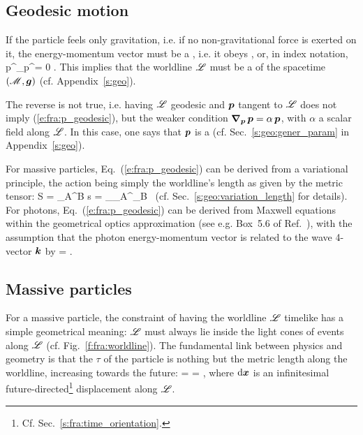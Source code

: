 \subsection{Geodesic motion} \label{s:fra:geod_motion}

If the particle feels only gravitation, i.e. if no non-gravitational force
is exerted on it, the energy-momentum vector must be a
, i.e. it obeys
\be \label{e:fra:p_geodesic}
     ,
\ee
or, in index notation,
\be
    p^\mu \nabla_\mu p^\alpha = 0 .
\ee
This implies that the worldline $\mathscr{L}$ must be a
 of the spacetime $(\mathscr{M},\bm{g})$ (cf. Appendix~\ref{s:geo}).
\begin{remark} \label{r:fra:geodesic_vector}
The reverse is not true, i.e. having $\mathscr{L}$ geodesic and $\bm{p}$
tangent to $\mathscr{L}$ does not imply (\ref{e:fra:p_geodesic}), but the
weaker condition $\bm{\nabla}_{\bm{p}}\,  \bm{p} = \alpha \, \bm{p}$, with $\alpha$
a scalar field along $\mathscr{L}$. In this case, one says that $\bm{p}$ is a
 (cf. Sec.~\ref{s:geo:gener_param}
in Appendix~\ref{s:geo}).
\end{remark}
For massive particles, Eq.~(\ref{e:fra:p_geodesic}) can be derived from
a variational principle, the action being simply the worldline's length
as given by the metric tensor:
\be
    S = \int_A^B \D s = \int_{\lambda_A}^{\lambda_B}
     \, \D\lambda
\ee
(cf. Sec.~\ref{s:geo:variation_length} for details).
For photons, Eq.~(\ref{e:fra:p_geodesic}) can be derived from
Maxwell equations
within the geometrical optics approximation (see e.g. Box~5.6 of Ref.~\cite{PoissW14}),
with the assumption that
the photon energy-momentum vector is related to the wave 4-vector $\bm{k}$ by
\be \label{e:fra:p_hbar_k}
     = \hbar {} .
\ee

\subsection{Massive particles} \label{s:fra:massive_part}

For a massive particle, the constraint of having the worldline $\mathscr{L}$ timelike
has a simple geometrical meaning: $\mathscr{L}$ must
always lie inside the light cones of events along $\mathscr{L}$ (cf. Fig.~\ref{f:fra:worldline}).
The fundamental link between physics and geometry is that the
 $\tau$ of the particle
is nothing but the metric length along the worldline, increasing towards the future:
\be \label{e:fra:proper_time}
    \D\tau =  =  ,
\ee
where $\mathrm{d}\bm{x}$ is an infinitesimal future-directed\footnote{Cf. Sec.~\ref{s:fra:time_orientation}.} displacement
along $\mathscr{L}$.

